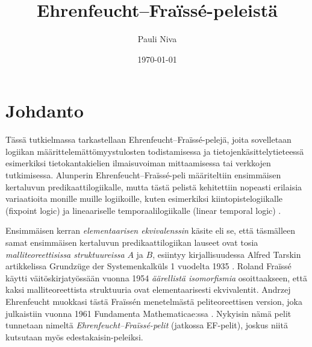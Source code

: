 \documentclass[finnish]{tktltiki2}
\title{Ehrenfeucht--Fraïssé-peleistä}
\author{Pauli Niva}
\date{\today}
\theoremstyle{definition}
\theoremstyle{remark}
\begin{document}

\frontmatter      %

\maketitle        %
\makeabstract     %

\tableofcontents  %


\mainmatter       %

\section{Johdanto}

Tässä tutkielmassa tarkastellaan Ehrenfeucht--Fraïssé-pelejä, joita sovelletaan logiikan määrittelemättömyystulosten todistamisessa ja tietojenkäsittelytieteessä esimerkiksi tietokantakielien ilmaisuvoiman mittaamisessa tai verkkojen tutkimisessa. Alunperin Ehrenfeucht--Fraïssé-peli määriteltiin ensimmäisen kertaluvun predikaattilogiikalle, mutta tästä pelistä kehitettiin nopeasti erilaisia variaatioita monille muille logiikoille, kuten esimerkiksi kiintopistelogiikalle (fixpoint logic) \cite{Bos93} ja lineaariselle temporaalilogiikalle (linear temporal logic) \cite{Ete96}.

Ensimmäisen kerran \textit{elementaarisen ekvivalenssin} käsite eli se, että täsmälleen samat ensimmäisen kertaluvun predikaattilogiikan lauseet ovat tosia \textit{malliteoreettisissa struktuureissa} $A$ ja $B$, esiintyy kirjallisuudessa Alfred Tarskin artikkelissa Grundzüge der Systemenkalküls 1 vuodelta 1935 \cite{Tar35}. Roland Fraïssé käytti väitöskirjatyössään \cite{Fra54} vuonna 1954 \textit{äärellistä isomorfismia} osoittaakseen, että kaksi malliteoreettista struktuuria ovat elementaarisesti ekvivalentit. Andrzej Ehrenfeucht muokkasi tästä Fraïssén menetelmästä peliteoreettisen version, joka julkaistiin vuonna 1961 Fundamenta Mathematicae:ssa \cite{Ehr61}. Nykyisin nämä pelit tunnetaan nimeltä \textit{Ehrenfeucht--Fraïssé-pelit} (jatkossa EF-pelit), joskus niitä kutsutaan myös edestakaisin-peleiksi.
\end{document}
